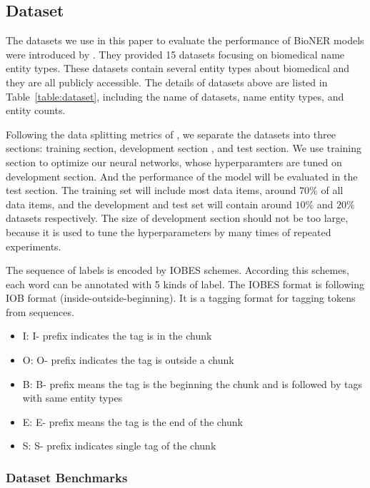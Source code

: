 
\subsection{Dataset}
The datasets we use in this paper to evaluate the performance of BioNER models were introduced by \citet{crichton2017neural}. They provided 15 datasets focusing on biomedical name entity types. These datasets contain several entity types about biomedical and they are all publicly accessible. The details of datasets above are listed in Table~\ref{table:dataset}, including the name of datasets, name entity types, and entity counts.

Following the data splitting metrics of \citet{lample2016neural}, we separate the datasets into three sections: training section, development section , and test section. We use training section to optimize our neural networks, whose hyperparamters are tuned on development section. And the performance of the model will be evaluated in the test section. The training set will include most data items, around $70\%$ of all data items, and the development and test set will contain around $10\%$ and $20\%$ datasets respectively. The size of development section should not be too large, because it is used to tune the hyperparameters by many times of repeated experiments.

The sequence of labels is encoded by IOBES schemes. According this schemes, each word can be annotated with 5 kinds of label. The IOBES format is following IOB format (inside-outside-beginning). It is a tagging format for tagging tokens from sequences.

\begin{itemize}\label{exp:iobes}
    \item I: I- prefix indicates the tag is in the chunk
    \item O: O- prefix indicates the tag is outside a chunk
    \item B: B- prefix means the tag is the beginning the chunk and is followed by tags with same entity types
    \item E: E- prefix means the tag is the end of the chunk
    \item S: S- prefix indicates single tag of the chunk
\end{itemize}

\subsubsection{Dataset Benchmarks}

